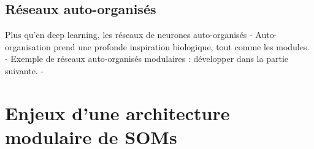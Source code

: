 \subsection{Réseaux auto-organisés}

Plus qu'en deep learning, les réseaux de neurones auto-organisés
- Auto-organisation prend une profonde inspiration biologique, tout comme les modules.
- Exemple de réseaux auto-organisés modulaires : développer dans la partie suivante.
- 


\section{Enjeux d'une architecture modulaire de SOMs}







